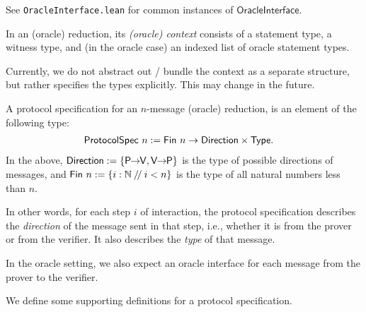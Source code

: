 See \texttt{OracleInterface.lean} for common instances of $\mathsf{OracleInterface}$.


\begin{definition}[Context]
    \label{def:context}
    In an (oracle) reduction, its \emph{(oracle) context} consists of a statement type, a witness
    type, and (in the oracle case) an indexed list of oracle statement types.

    Currently, we do not abstract out / bundle the context as a separate structure, but rather
    specifies the types explicitly. This may change in the future.
\end{definition}

\begin{definition}
    \label{def:protocol_spec}
    A protocol specification for an $n$-message (oracle) reduction, is an element of the following type:
    \begin{align*}
        \mathsf{ProtocolSpec}\ n &:= \mathsf{Fin}\ n \to \mathsf{Direction} \times \mathsf{Type}.
    \end{align*}
    In the above, $\Direction := \{ \PtoVdir, \VtoPdir \}$ is the type of possible directions of messages, and $\mathsf{Fin}\ n := \{ i : \mathbb{N} \mathbin{/\!/} i < n \}$ is the type of all natural numbers less than $n$.

    In other words, for each step $i$ of interaction, the protocol specification describes the \emph{direction} of the message sent in that step, i.e., whether it is from the prover or from the verifier. It also describes the \emph{type} of that message.

    In the oracle setting, we also expect an oracle interface for each message from the prover to the verifier.
\end{definition}

We define some supporting definitions for a protocol specification.

